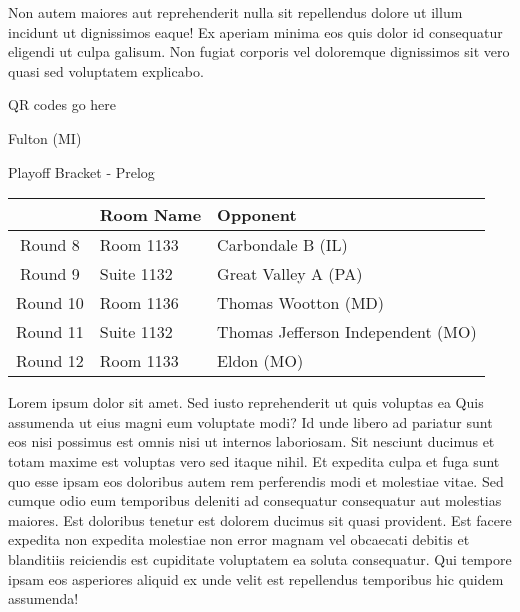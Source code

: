 \documentclass{article}%
\begin{document}
\newline%
Non autem maiores aut reprehenderit nulla sit repellendus dolore ut illum incidunt ut dignissimos eaque! Ex aperiam minima eos quis dolor id consequatur eligendi ut culpa galisum. Non fugiat corporis vel doloremque dignissimos sit vero quasi sed voluptatem explicabo.\newline%
\newline%
%
\vspace*{30pt}%
\begin{center}%
\begin{Huge}%
QR codes go here%
\end{Huge}%
\end{center}%
\newpage%
\begin{center}%
\begin{Huge}%
Fulton (MI)%
\end{Huge}%
\vspace*{8pt}%
\linebreak%
\begin{Large}%
Playoff Bracket {-} Prelog%
\end{Large}%
\end{center}%
\begin{tabularx}{\textwidth}{|c|Y|Y|}%
\hline%
&Room Name&Opponent\\%
\hline%
Round 8&Room 1133&Carbondale B (IL)\\%
Round 9&Suite 1132&Great Valley A (PA)\\%
Round 10&Room 1136&Thomas Wootton (MD)\\%
Round 11&Suite 1132&Thomas Jefferson Independent (MO)\\%
Round 12&Room 1133&Eldon (MO)\\%
\hline%
\end{tabularx}%
\vspace*{8pt}%
\linebreak%
\newline%
\newline%
Lorem ipsum dolor sit amet. Sed iusto reprehenderit ut quis voluptas ea Quis assumenda ut eius magni eum voluptate modi? Id unde libero ad pariatur sunt eos nisi possimus est omnis nisi ut internos laboriosam. Sit nesciunt ducimus et totam maxime est voluptas vero sed itaque nihil. Et expedita culpa et fuga sunt quo esse ipsam eos doloribus autem rem perferendis modi et molestiae vitae.\newline%
\newline%
Sed cumque odio eum temporibus deleniti ad consequatur consequatur aut molestias maiores. Est doloribus tenetur est dolorem ducimus sit quasi provident. Est facere expedita non expedita molestiae non error magnam vel obcaecati debitis et blanditiis reiciendis est cupiditate voluptatem ea soluta consequatur. Qui tempore ipsam eos asperiores aliquid ex unde velit est repellendus temporibus hic quidem assumenda!\newline%
\end{document}

